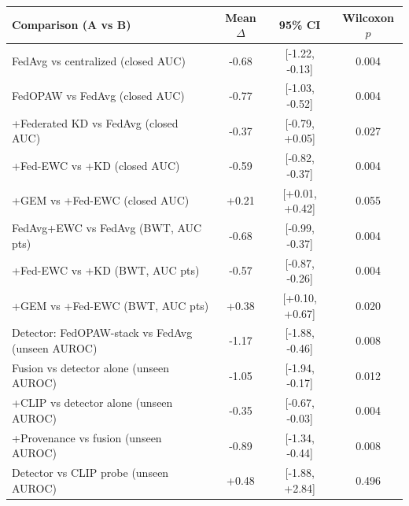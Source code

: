 \begin{tabular}{@{}lccc@{}}
\toprule
Comparison (A vs B) & Mean $\Delta$ & 95\% CI & Wilcoxon $p$ \\
\midrule
FedAvg vs centralized (closed AUC) & -0.68 & [-1.22, -0.13] & 0.004 \\
FedOPAW vs FedAvg (closed AUC) & -0.77 & [-1.03, -0.52] & 0.004 \\
+Federated KD vs FedAvg (closed AUC) & -0.37 & [-0.79, +0.05] & 0.027 \\
+Fed-EWC vs +KD (closed AUC) & -0.59 & [-0.82, -0.37] & 0.004 \\
+GEM vs +Fed-EWC (closed AUC) & +0.21 & [+0.01, +0.42] & 0.055 \\
FedAvg+EWC vs FedAvg (BWT, AUC pts) & -0.68 & [-0.99, -0.37] & 0.004 \\
+Fed-EWC vs +KD (BWT, AUC pts) & -0.57 & [-0.87, -0.26] & 0.004 \\
+GEM vs +Fed-EWC (BWT, AUC pts) & +0.38 & [+0.10, +0.67] & 0.020 \\
Detector: FedOPAW-stack vs FedAvg (unseen AUROC) & -1.17 & [-1.88, -0.46] & 0.008 \\
Fusion vs detector alone (unseen AUROC) & -1.05 & [-1.94, -0.17] & 0.012 \\
+CLIP vs detector alone (unseen AUROC) & -0.35 & [-0.67, -0.03] & 0.004 \\
+Provenance vs fusion (unseen AUROC) & -0.89 & [-1.34, -0.44] & 0.008 \\
Detector vs CLIP probe (unseen AUROC) & +0.48 & [-1.88, +2.84] & 0.496 \\
\bottomrule
\end{tabular}
